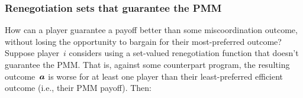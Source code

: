\documentclass[sigconf]{aamas}
\theoremstyle{definition}
\begin{document}
\subsubsection{Renegotiation
sets that guarantee
the PMM}
How can a player guarantee
a payoff better
than some miscoordination outcome,
without losing the opportunity
to bargain for their most-preferred outcome?
Suppose
player~$i$ considers
using a set-valued renegotiation
function that doesn't
guarantee the PMM.
That is,
against some counterpart 
program,
the resulting outcome~$\boldsymbol{a}$ is worse for at least one player
than their 
least-preferred
efficient outcome (i.e., their PMM payoff). Then:
\end{document}
